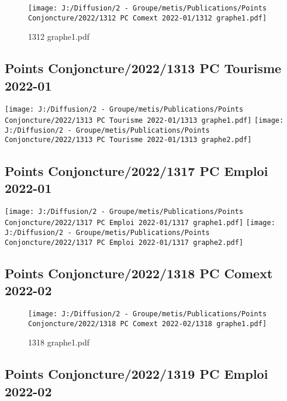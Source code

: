 \documentclass[
]{article}
\begin{document}
\begin{figure}
\centering
\texttt{[image: J:/Diffusion/2 - Groupe/metis/Publications/Points Conjoncture/2022/1312 PC Comext 2022-01/1312 graphe1.pdf]}
\caption{1312 graphe1.pdf}
\end{figure}

\hypertarget{points-conjoncture20221313-pc-tourisme-2022-01}{%
\subsection{Points Conjoncture/2022/1313 PC Tourisme
2022-01}\label{points-conjoncture20221313-pc-tourisme-2022-01}}

\texttt{[image: J:/Diffusion/2 - Groupe/metis/Publications/Points Conjoncture/2022/1313 PC Tourisme 2022-01/1313 graphe1.pdf]}
\texttt{[image: J:/Diffusion/2 - Groupe/metis/Publications/Points Conjoncture/2022/1313 PC Tourisme 2022-01/1313 graphe2.pdf]}

\hypertarget{points-conjoncture20221317-pc-emploi-2022-01}{%
\subsection{Points Conjoncture/2022/1317 PC Emploi
2022-01}\label{points-conjoncture20221317-pc-emploi-2022-01}}

\texttt{[image: J:/Diffusion/2 - Groupe/metis/Publications/Points Conjoncture/2022/1317 PC Emploi 2022-01/1317 graphe1.pdf]}
\texttt{[image: J:/Diffusion/2 - Groupe/metis/Publications/Points Conjoncture/2022/1317 PC Emploi 2022-01/1317 graphe2.pdf]}

\hypertarget{points-conjoncture20221318-pc-comext-2022-02}{%
\subsection{Points Conjoncture/2022/1318 PC Comext
2022-02}\label{points-conjoncture20221318-pc-comext-2022-02}}

\begin{figure}
\centering
\texttt{[image: J:/Diffusion/2 - Groupe/metis/Publications/Points Conjoncture/2022/1318 PC Comext 2022-02/1318 graphe1.pdf]}
\caption{1318 graphe1.pdf}
\end{figure}

\hypertarget{points-conjoncture20221319-pc-emploi-2022-02}{%
\subsection{Points Conjoncture/2022/1319 PC Emploi
2022-02}\label{points-conjoncture20221319-pc-emploi-2022-02}}
\end{document}
